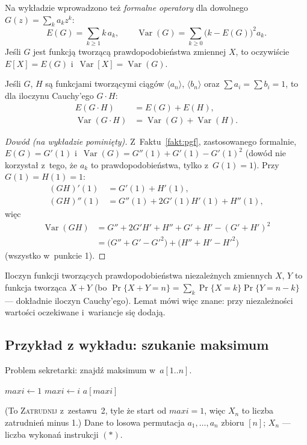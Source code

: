 \documentclass[11pt]{article}
\begin{document}
Na wykładzie wprowadzono też \emph{formalne operatory} dla dowolnego
$G(z)=\sum_ka_kz^k$:
\[
E(G)=\sum_{k\ge1}k\,a_k,\qquad
\operatorname{Var}(G)=\sum_{k\ge0}\bigl(k-E(G)\bigr)^2a_k.
\]
Jeśli $G$ jest funkcją tworzącą prawdopodobieństwa zmiennej $X$, to
oczywiście $E[X]=E(G)$ i~$\operatorname{Var}[X]=\operatorname{Var}(G)$.

\begin{lemat}[z wykładu]\label{lem:iloczyn}
Jeśli $G$, $H$ są funkcjami tworzącymi ciągów $\langle a_n\rangle$,
$\langle b_n\rangle$ oraz $\sum a_i=\sum b_i=1$, to dla iloczynu
Cauchy'ego $G\cdot H$:
\begin{align*}
E(G\cdot H)&=E(G)+E(H),\\
\operatorname{Var}(G\cdot H)&=\operatorname{Var}(G)+\operatorname{Var}(H).
\end{align*}
\end{lemat}
\begin{proof}[Dowód (na wykładzie pominięty)]
Z~Faktu~\ref{fakt:pgf}, zastosowanego formalnie, $E(G)=G'(1)$ i~$\operatorname{Var}(G)=G''(1)+G'(1)-G'(1)^2$
(dowód nie korzystał z~tego, że $a_k$ to prawdopodobieństwa, tylko z~$G(1)=1$).
Przy $G(1)=H(1)=1$:
\begin{align*}
(GH)'(1)&=G'(1)+H'(1),\\
(GH)''(1)&=G''(1)+2G'(1)H'(1)+H''(1),
\end{align*}
więc
\begin{align*}
\operatorname{Var}(GH)&=G''+2G'H'+H''+G'+H'-(G'+H')^2\\
&=\bigl(G''+G'-G'^2\bigr)+\bigl(H''+H'-H'^2\bigr)
\end{align*}
(wszystko w~punkcie 1).
\end{proof}

\begin{intuicja}
Iloczyn funkcji tworzących prawdopodobieństwa niezależnych zmiennych $X$, $Y$
to funkcja tworząca $X+Y$ (bo $\Pr\{X+Y=n\}=\sum_k\Pr\{X=k\}\Pr\{Y=n-k\}$ ---
dokładnie iloczyn Cauchy'ego). Lemat mówi więc znane: przy niezależności
wartości oczekiwane i~wariancje się dodają.
\end{intuicja}

\subsection*{Przykład z wykładu: szukanie maksimum}

Problem sekretarki: znajdź maksimum w~$a[1..n]$.
\begin{algorithm}[H]
\caption{\textsc{Max} (z wykładu)}
\begin{algorithmic}[1]
\State $\mathit{maxi}\gets1$
     \State $\mathit{maxi}\gets i$ \Comment{$(*)$}
  \EndIf
\EndFor
\State \Return $a[\mathit{maxi}]$
\end{algorithmic}
\end{algorithm}
(To \textsc{Zatrudnij} z~zestawu~2, tyle że start od $\mathit{maxi}=1$,
więc $X_n$ to liczba zatrudnień minus 1.) Dane to losowa permutacja $a_1,\dots,a_n$ zbioru
$[n]$; $X_n$ --- liczba wykonań instrukcji $(*)$.
\end{document}
